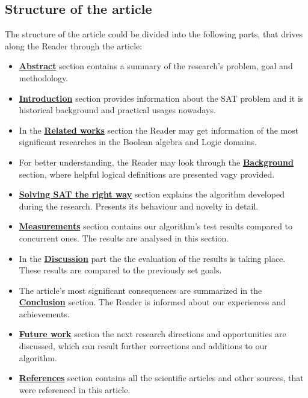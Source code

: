 \documentclass{article}
\begin{document}
\subsection{Structure of the article}
The structure of the article could be divided into the following parts, that drives along the Reader through the article:
\begin{itemize}
    \item \hyperref[sec:abstract]{\textbf{Abstract}} section contains a summary of the research's problem, goal and methodology.
    \item \hyperref[sec:intro]{\textbf{Introduction}} section provides information about the SAT problem and it is historical background and practical usages nowadays.
    \item In the \hyperref[sec:relwork]{\textbf{Related works}} section the Reader may get information of the most significant researches in the Boolean algebra and Logic domains.
    \item For better understanding, the Reader may look through the \hyperref[sec:background]{\textbf{Background}} section, where helpful logical definitions are presented vagy provided.
    \item \hyperref[sec:methodology]{\textbf{Solving SAT the right way}} section explains the algorithm developed during the research. Presents its behaviour and novelty in detail.
    \item \hyperref[sec:measurements]{\textbf{Measurements}} section contains our algorithm's test results compared to concurrent ones. The results are analysed in this section.
    \item In the \hyperref[sec:discussion]{\textbf{Discussion}} part the the evaluation of the results is taking place. These results are compared to the previously set goals.
    \item The article's most significant consequences are summarized in the \hyperref[sec:conclusion]{\textbf{Conclusion}} section. The Reader is informed about our experiences and achievements.
    \item \hyperref[sec:future]{\textbf{Future work}} section the next research directions and opportunities are discussed, which can result further corrections and additions to our algorithm.
    \item \hyperref[sec:bib]{\textbf{References}} section contains all the scientific articles and other sources, that were referenced in this article.
\end{itemize}
\end{document}
